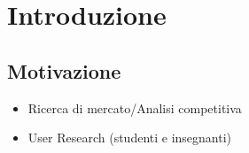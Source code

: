\documentclass[twoside]{supsistudent}
\begin{document}
\chapter{Introduzione}

\section{Motivazione}

\begin{itemize}
  \item Ricerca di mercato/Analisi competitiva
  \item User Research (studenti e insegnanti)
\end{itemize}

%

%
%
%
%
%
%
%
%
%
%



\end{document}
